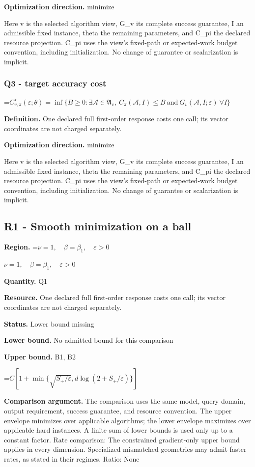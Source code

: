 \documentclass[10pt,a4paper]{article}
\newcommand{\AtlasMath}[1]{\par\begingroup\centering\setbox0=\hbox{$\displaystyle #1$}\ifdim\wd0>1.4\linewidth\typeout{ATLAS WIDE FORMULA: \the\wd0}\fi\ifdim\wd0>\linewidth\resizebox{\linewidth}{!}{\box0}\else\box0\fi\par\endgroup}
\newcommand{\AtlasInlineMath}[1]{\begingroup\setbox0=\hbox{$#1$}\ifdim\wd0>.4\linewidth\endgroup\AtlasMath{#1}\else\endgroup$#1$\fi}
\begin{document}
\textbf{Optimization direction.} minimize

Here v is the selected algorithm view, G\_v its complete success guarantee, I an admissible fixed instance, theta the remaining parameters, and C\_pi the declared resource projection. C\_pi uses the view's fixed-path or expected-work budget convention, including initialization. No change of guarantee or scalarization is implicit.

\subsubsection{Q3 - target accuracy cost}
\AtlasMath{C^\star_{v,\pi}(\varepsilon;\theta)=\inf\{B\ge0:\exists\mathcal A\in\mathfrak A_v,\ C_\pi(\mathcal A,I)\le B\ \text{and}\ G_v(\mathcal A,I;\varepsilon)\ \forall I\}}
\textbf{Definition.} One declared full first-order response costs one call; its vector coordinates are not charged separately.

\textbf{Optimization direction.} minimize

Here v is the selected algorithm view, G\_v its complete success guarantee, I an admissible fixed instance, theta the remaining parameters, and C\_pi the declared resource projection. C\_pi uses the view's fixed-path or expected-work budget convention, including initialization. No change of guarantee or scalarization is implicit.

\subsection{R1 - Smooth minimization on a ball}
\textbf{Region.} \AtlasInlineMath{\nu=1,\quad\beta=\beta_1,\quad\varepsilon>0}

\textbf{Quantity.} Q1

\textbf{Resource.} One declared full first-order response costs one call; its vector coordinates are not charged separately.

\textbf{Status.} Lower bound missing

\textbf{Lower bound.} No admitted bound for this comparison

\textbf{Upper bound.} B1, B2

\AtlasMath{C[1+\min\{\sqrt{S_+/\varepsilon},d\log(2+S_+/\varepsilon)\}]}
\textbf{Comparison argument.} The comparison uses the same model, query domain, output requirement, success guarantee, and resource convention. The upper envelope minimizes over applicable algorithms; the lower envelope maximizes over applicable hard instances. A finite sum of lower bounds is used only up to a constant factor. Rate comparison: The constrained gradient-only upper bound applies in every dimension. Specialized mismatched geometries may admit faster rates, as stated in their regimes. Ratio: None
\end{document}
